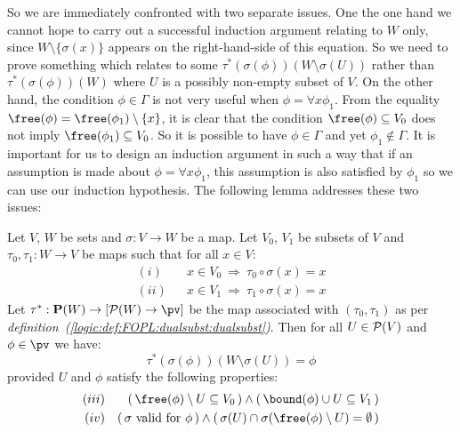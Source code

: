 So we are immediately confronted with two separate issues. One the
one hand we cannot hope to carry out a successful induction argument
relating to $W$ only, since $W\setminus\{\sigma(x)\}$ appears on the
right-hand-side of this equation. So we need to prove something
which relates to some $\tau^{*}(\sigma(\phi))(W\setminus\sigma(U))$
rather than $\tau^{*}(\sigma(\phi))(W)$ where $U$ is a possibly
non-empty subset of $V$. On the other hand, the condition
$\phi\in\Gamma$ is not very useful when $\phi=\forall x\phi_{1}$.
From the equality $\free(\phi)=\free(\phi_{1})\setminus\{x\}$, it is
clear that the condition $\free(\phi)\subseteq V_{0}$ does not imply
$\free(\phi_{1})\subseteq V_{0}$. So it is possible to have
$\phi\in\Gamma$ and yet $\phi_{1}\not\in\Gamma$. It is important for
us to design an induction argument in such a way that if an
assumption is made about $\phi=\forall x\phi_{1}$, this assumption
is also satisfied by $\phi_{1}$ so we can use our induction
hypothesis. The following lemma addresses these two issues:
\begin{lemma}\label{logic:lemma:FOPL:localinv:lem}
Let $V$, $W$ be sets and $\sigma:V\to W$ be a map. Let $V_{0}$,
$V_{1}$ be subsets of $V$ and $\tau_{0},\tau_{1}:W\to V$ be maps
such that for all $x\in V$:
   \begin{eqnarray*}
    (i)&&x\in V_{0}\ \Rightarrow\ \tau_{0}\circ\sigma(x)=x\\
    (ii)&&x\in V_{1}\ \Rightarrow\ \tau_{1}\circ\sigma(x)=x
    \end{eqnarray*}
Let $\tau^{*}:{\bf P}(W)\to[{\cal P}(W)\to\pv]$ be the map
associated with $(\tau_{0},\tau_{1})$ as per {\em
definition~(\ref{logic:def:FOPL:dualsubst:dualsubst})}. Then for all
$U\in{\cal P}(V)$ and $\phi\in\pv$ we have:
    \begin{equation}\label{logic:eqn:FOPL:localinv:lemma:1}
    \tau^{*}(\sigma(\phi))(W\setminus\sigma(U))=\phi
    \end{equation}
provided $U$ and $\phi$ satisfy the following properties:
    \begin{eqnarray*}
    (iii)&&(\,\free(\phi)\setminus U\subseteq V_{0}\,)
    \land(\,\bound(\phi)\cup U\subseteq V_{1}\,)\\
    (iv)&&(\,\mbox{$\sigma$ valid for $\phi$}\,)\land
    (\,\sigma(U)\cap\sigma(\free(\phi)\setminus U)=\emptyset\,)\\
    \end{eqnarray*}
\end{lemma}
